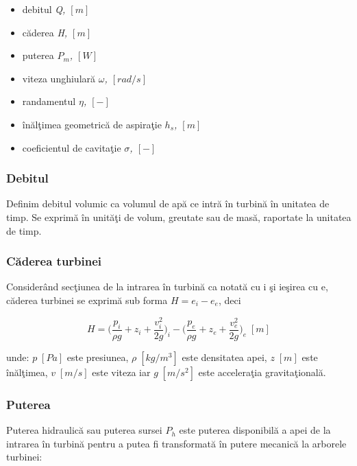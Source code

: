 \begin{itemize}
	\item debitul \textit{Q, $[\si{m}]$}
	\item c\u{a}derea \textit{H, $[\si{m}]$}
	\item puterea \textit{$P_m$, $[\si{W}]$}
	\item viteza unghiular\u{a} \textit{\(\omega\), $[\si{rad/s}]$}
	\item randamentul \textit{\(\eta\), $[-]$}
	\item \^{i}n\u{a}l\c{t}imea geometric\u{a} de aspira\c{t}ie \textit{\(h_s\), $[\si{m}]$}
	\item coeficientul de cavita\c{t}ie \textit{\(\sigma\), $[-]$}
\end{itemize}


\subsubsection{Debitul}

Definim debitul volumic ca volumul de ap\u{a} ce intr\u{a} \^{i}n turbin\u{a} \^{i}n unitatea de timp. Se exprim\u{a} \^{i}n unit\u{a}\c{t}i de volum, greutate sau de mas\u{a}, raportate la unitatea de timp.


\subsubsection{C\u{a}derea turbinei}

Consider\^{a}nd sec\c{t}iunea de la intrarea \^{i}n turbin\u{a} ca notat\u{a} cu i \c{s}i ie\c{s}irea cu e, c\u{a}derea turbinei se exprim\u{a} sub forma $H=e_i-e_e$, deci

\begin{equation}
H=\bigg(\frac{p_i}{{\rho}g}+z_i+\frac{v_i^2}{2g}\bigg)_i-\bigg(\frac{p_e}{{\rho}g}+z_e+\frac{v_e^2}{2g}\bigg)_e \;[\si{m}]
\end{equation}

unde: $p\;[\si{Pa}]$ este presiunea, ${\rho}\;[\si{kg/m^3}]$ este densitatea apei, $z\;[\si{m}]$ este \^{i}n\u{a}l\c{t}imea, $v\;[\si{m/s}]$ este viteza iar $g\;[\si{m/s^2}]$ este accelera\c{t}ia gravita\c{t}ional\u{a}.

\subsubsection{Puterea}

Puterea hidraulic\u{a} sau puterea sursei $P_h$ este puterea disponibil\u{a} a apei de la intrarea \^{i}n turbin\u{a} pentru a putea fi transformat\u{a} \^{i}n putere mecanic\u{a} la arborele turbinei:

